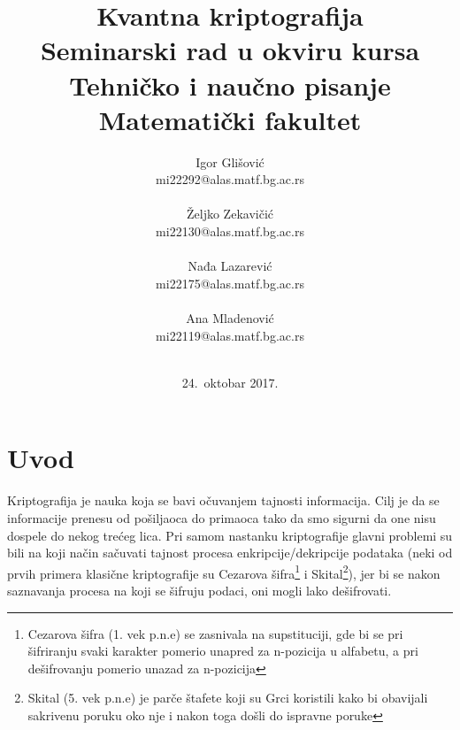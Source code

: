 \documentclass[a4paper]{article}
\begin{document}
\title{Kvantna kriptografija\\ \small{Seminarski rad u okviru kursa\\Tehničko i naučno pisanje\\ Matematički fakultet}}

\author{Igor Glišović\\mi22292@alas.matf.bg.ac.rs\\\\ Željko Zekavičić\\mi22130@alas.matf.bg.ac.rs\\\\ Nađa Lazarević\\mi22175@alas.matf.bg.ac.rs\\\\ Ana Mladenović\\mi22119@alas.matf.bg.ac.rs\\\\}
\date{24.~oktobar 2017.}
\maketitle


\newpage

\tableofcontents

\newpage

\section{Uvod}
\label{sec:uvod}
Kriptografija je nauka koja se bavi očuvanjem tajnosti informacija. Cilj je da se informacije prenesu od pošiljaoca do primaoca tako da smo sigurni da one nisu dospele do nekog trećeg lica. Pri samom nastanku kriptografije glavni problemi su bili na koji način sačuvati tajnost procesa enkripcije/dekripcije podataka (neki od prvih primera klasične kriptografije su Cezarova šifra\footnote{Cezarova šifra (1. vek p.n.e) se zasnivala na supstituciji, gde bi se pri šifriranju svaki karakter pomerio unapred za n-pozicija u alfabetu, a pri dešifrovanju pomerio unazad za n-pozicija}  i Skital\footnote{Skital (5. vek p.n.e) je parče štafete koji su Grci koristili kako bi obavijali sakrivenu poruku oko nje i nakon toga došli do ispravne poruke}), jer bi se nakon saznavanja procesa na koji se šifruju podaci, oni mogli lako dešifrovati.
\end{document}
